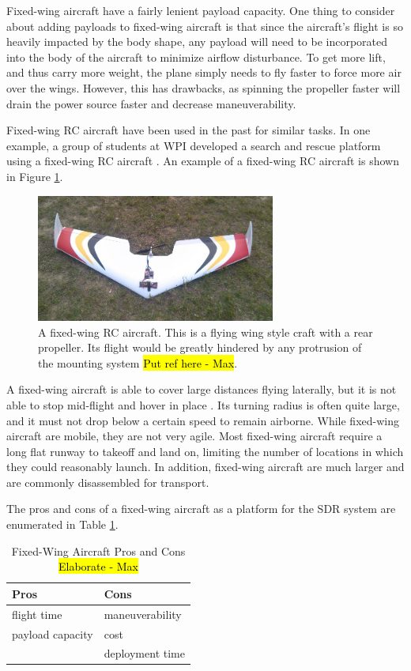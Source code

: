 Fixed-wing aircraft have a fairly lenient payload capacity. One thing to consider about adding payloads to fixed-wing aircraft is that since the aircraft’s flight is so heavily impacted by the body shape, any payload will need to be incorporated into the body of the aircraft to minimize airflow disturbance. To get more lift, and thus carry more weight, the plane simply needs to fly faster to force more air over the wings. However, this has drawbacks, as spinning the propeller faster will drain the power source faster and decrease maneuverability.\par
Fixed-wing RC aircraft have been used in the past for similar tasks. In one example, a group of students at WPI developed a search and rescue platform using a fixed-wing RC aircraft \cite{airplane_iqp}. An example of a fixed-wing RC aircraft is shown in Figure \ref{fig:fixed_wing}.
\begin{figure}[ht]
\centering
\includegraphics[width=0.70\textwidth]{img/fixed-wing.jpg}
\caption{A fixed-wing RC aircraft. This is a flying wing style craft with a rear propeller. Its flight would be greatly hindered by any protrusion of the mounting system \hl{Put ref here - Max}.}
\label{fig:fixed_wing}
\end{figure}\par
A fixed-wing aircraft is able to cover large distances flying laterally, but it is not able to stop mid-flight and hover in place \cite{airplane_book}. Its turning radius is often quite large, and it must not drop below a certain speed to remain airborne. While fixed-wing aircraft are mobile, they are not very agile. Most fixed-wing aircraft require a long flat runway to takeoff and land on, limiting the number of locations in which they could reasonably launch. In addition, fixed-wing aircraft are much larger and are commonly disassembled for transport.\par
The pros and cons of a fixed-wing aircraft as a platform for the SDR system are enumerated in Table \ref{table:wing_pc}.
\begin{table}[ht]
\centering
\caption{Fixed-Wing Aircraft Pros and Cons \hl{Elaborate - Max}}
\label{table:wing_pc}
\begin{tabular}{l|l}
  Pros & Cons \\ \hline
  flight time & maneuverability \\
  payload capacity & cost \\
   & deployment time \\
\end{tabular}
\end{table}\par

